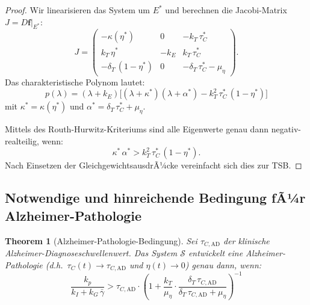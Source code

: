 ﻿\documentclass[12pt,a4paper]{article}
\newtheorem{theorem}{Theorem}[section]
\theoremstyle{definition}
\begin{document}
	\begin{proof}
		Wir linearisieren das System um $E^*$ und berechnen die Jacobi-Matrix $J = D\mathbf{f}|_{E^*}$:
		\[
		J = \begin{pmatrix}
			-\kappa(\eta^*) & 0 & -k_T\,\tau_C^* \\
			k_T\,\eta^* & -k_E & k_T\,\tau_C^* \\
			-\delta_T\,(1-\eta^*) & 0 & -\delta_T\,\tau_C^* - \mu_\eta
		\end{pmatrix}.
		\]
		Das charakteristische Polynom lautet:
		\[
		p(\lambda) = (\lambda + k_E)\bigl[(\lambda + \kappa^*)(\lambda + \alpha^*) - k_T^2\,\tau_C^*\,(1-\eta^*)\bigr]
		\]
		mit $\kappa^* = \kappa(\eta^*)$ und $\alpha^* = \delta_T\,\tau_C^* + \mu_\eta$.
		
		Mittels des Routh-Hurwitz-Kriteriums sind alle Eigenwerte genau dann negativ-realteilig, wenn:
		\[
		\kappa^*\,\alpha^* > k_T^2\,\tau_C^*\,(1-\eta^*).
		\]
		Nach Einsetzen der GleichgewichtsausdrÃ¼cke vereinfacht sich dies zur TSB.
	\end{proof}
	
	\subsection{Notwendige und hinreichende Bedingung fÃ¼r Alzheimer-Pathologie}
	
	\begin{theorem}[Alzheimer-Pathologie-Bedingung]
		\label{thm:alzheimer_condition}
		Sei $\tau_{C,\text{AD}}$ der klinische Alzheimer-Diagnoseschwellenwert. Das System $\mathcal{S}$ entwickelt eine Alzheimer-Pathologie (d.h.\ $\tau_C(t) \to \tau_{C,\text{AD}}$ und $\eta(t) \to 0$) genau dann, wenn:
		\begin{equation}
			\boxed{\frac{k_p}{k_I + k_G\,\bar{\gamma}} > \tau_{C,\text{AD}} \cdot \left(1 + \frac{k_T}{\mu_\eta}\cdot\frac{\delta_T\,\tau_{C,\text{AD}}}{\delta_T\,\tau_{C,\text{AD}} + \mu_\eta}\right)^{-1}}
			\label{eq:alzheimer_bedingung}
		\end{equation}
	\end{theorem}
	
\end{document}
